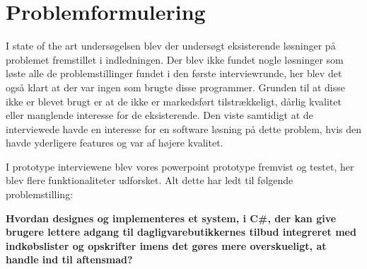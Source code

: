 \section{Problemformulering}\label{section:problemformulering}

%
%
%


I state of the art undersøgelsen  blev der undersøgt eksisterende løsninger på problemet fremstillet i indledningen. 
Der blev ikke fundet nogle løsninger som løste alle de problemstillinger fundet i den første interviewrunde, her blev det også klart at der var ingen som brugte disse programmer.
Grunden til at disse ikke er blevet brugt er at de ikke er markedsført tilstrækkeligt, dårlig kvalitet eller manglende interesse for de eksisterende. 
Den viste samtidigt at de interviewede havde en interesse for en software løsning på dette problem, hvis den havde yderligere features og var af højere kvalitet. 

I prototype interviewene blev vores powerpoint prototype fremvist og testet, her blev flere funktionaliteter udforsket. 
Alt dette har ledt til følgende problemstilling:

\textbf{Hvordan designes og implementeres et system, i C\#, der kan give brugere lettere adgang til dagligvarebutikkernes tilbud integreret med indkøbslister og opskrifter imens det gøres mere overskueligt, at handle ind til aftensmad? }
